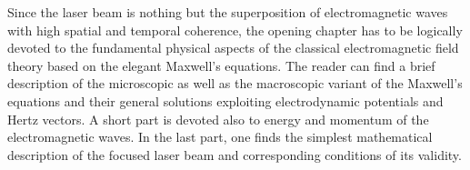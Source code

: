 Since the laser beam is nothing but the superposition of electromagnetic waves with high spatial and temporal coherence, the opening chapter has to be logically devoted to the fundamental physical aspects of the classical electromagnetic field theory based on the elegant Maxwell's equations. The reader can find a brief description of the microscopic as well as the macroscopic variant of the Maxwell's equations and their general solutions exploiting electrodynamic potentials and Hertz vectors. A short part is devoted also to energy and momentum of the electromagnetic waves. In the last part, one finds the simplest mathematical description of the focused laser beam and corresponding conditions of its validity.